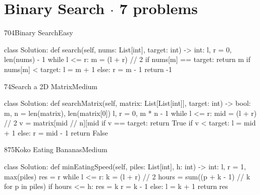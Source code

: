 \section{Binary Search \texorpdfstring{{\normalsize\color{muted}$\cdot$ 7 problems}}{- 7 problems}}

\begin{problem}{704}{Binary Search}{Easy}
\begin{code}
class Solution:
    def search(self, nums: List[int], target: int) -> int:
        l, r = 0, len(nums) - 1
        while l <= r:
            m = (l + r) // 2
            if nums[m] == target:
                return m
            if nums[m] < target:
                l = m + 1
            else:
                r = m - 1
        return -1
\end{code}
\end{problem}

\begin{problem}{74}{Search a 2D Matrix}{Medium}
\begin{code}
class Solution:
    def searchMatrix(self, matrix: List[List[int]], target: int) -> bool:
        m, n = len(matrix), len(matrix[0])
        l, r = 0, m * n - 1
        while l <= r:
            mid = (l + r) // 2
            v = matrix[mid // n][mid %
            if v == target:
                return True
            if v < target:
                l = mid + 1
            else:
                r = mid - 1
        return False
\end{code}
\end{problem}

\begin{problem}{875}{Koko Eating Bananas}{Medium}
\begin{code}
class Solution:
    def minEatingSpeed(self, piles: List[int], h: int) -> int:
        l, r = 1, max(piles)
        res = r
        while l <= r:
            k = (l + r) // 2
            hours = sum((p + k - 1) // k for p in piles)
            if hours <= h:
                res = k
                r = k - 1
            else:
                l = k + 1
        return res
\end{code}
\end{problem}


